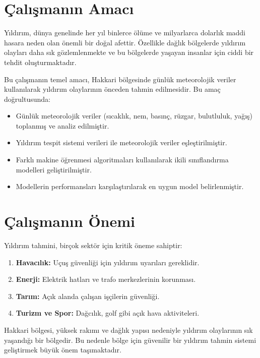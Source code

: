 \section{Çalışmanın Amacı}

Yıldırım, dünya genelinde her yıl binlerce ölüme ve milyarlarca dolarlık maddi hasara neden olan önemli bir doğal afettir. Özellikle dağlık bölgelerde yıldırım olayları daha sık gözlemlenmekte ve bu bölgelerde yaşayan insanlar için ciddi bir tehdit oluşturmaktadır.

Bu çalışmanın temel amacı, Hakkari bölgesinde günlük meteorolojik veriler kullanılarak yıldırım olaylarının önceden tahmin edilmesidir. Bu amaç doğrultusunda:

\begin{itemize}
    \item Günlük meteorolojik veriler (sıcaklık, nem, basınç, rüzgar, bulutluluk, yağış) toplanmış ve analiz edilmiştir.
    \item Yıldırım tespit sistemi verileri ile meteorolojik veriler eşleştirilmiştir.
    \item Farklı makine öğrenmesi algoritmaları kullanılarak ikili sınıflandırma modelleri geliştirilmiştir.
    \item Modellerin performansları karşılaştırılarak en uygun model belirlenmiştir.
\end{itemize}

\section{Çalışmanın Önemi}

Yıldırım tahmini, birçok sektör için kritik öneme sahiptir:

\begin{enumerate}
    \item \textbf{Havacılık:} Uçuş güvenliği için yıldırım uyarıları gereklidir.
    \item \textbf{Enerji:} Elektrik hatları ve trafo merkezlerinin korunması.
    \item \textbf{Tarım:} Açık alanda çalışan işçilerin güvenliği.
    \item \textbf{Turizm ve Spor:} Dağcılık, golf gibi açık hava aktiviteleri.
\end{enumerate}

Hakkari bölgesi, yüksek rakımı ve dağlık yapısı nedeniyle yıldırım olaylarının sık yaşandığı bir bölgedir. Bu nedenle bölge için güvenilir bir yıldırım tahmin sistemi geliştirmek büyük önem taşımaktadır.

